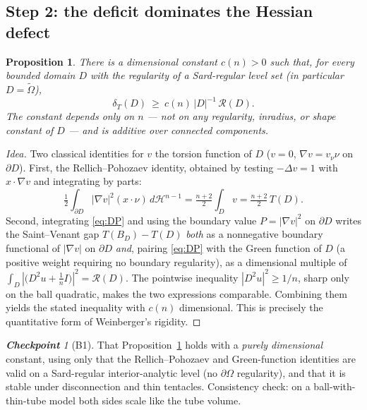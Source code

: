 \documentclass[11pt]{amsart}
\newtheorem{proposition}[theorem]{Proposition}
\theoremstyle{definition}
\theoremstyle{remark}
\newtheorem*{checkpoint}{\textbf{Checkpoint}}
\newcommand{\Om}{\Omega}
\newcommand{\Ot}{\widetilde\Omega}
\newcommand{\dT}{\delta_T}
\newcommand{\Hess}{D^2u}
\newcommand{\TF}{\bigl(\Hess+\tfrac1n I\bigr)}
\newcommand{\R}{\mathcal R}
\newcommand{\Hn}{\mathcal H^{n-1}}
\begin{document}
\subsection{Step 2: the deficit dominates the Hessian defect}
\begin{proposition}\label{prop:B1}
There is a dimensional constant $c(n)>0$ such that, for every bounded domain
$D$ with the regularity of a Sard-regular level set \textup{(}in particular
$D=\Ot$\textup{)},
\[
  \dT(D)\ \ge\ c(n)\,|D|^{-1}\,\R(D).
\]
The constant depends only on $n$ --- not on any regularity, inradius, or shape
constant of $D$ --- and is additive over connected components.
\end{proposition}
\begin{proof}[Idea]
Two classical identities for $v$ the torsion function of $D$
($v=0$, $\nabla v=v_\nu\nu$ on $\partial D$). First, the Rellich--Pohozaev
identity, obtained by testing $-\Delta v=1$ with $x\!\cdot\!\nabla v$ and
integrating by parts:
\[
  \tfrac12\!\int_{\partial D}|\nabla v|^2(x\!\cdot\!\nu)\,d\Hn
  =\tfrac{n+2}{2}\!\int_D v=\tfrac{n+2}{2}\,T(D).
\]
Second, integrating \eqref{eq:DP} and using the boundary value
$P=|\nabla v|^2$ on $\partial D$ writes the Saint--Venant gap
$T(B_D)-T(D)$ \emph{both} as a nonnegative boundary functional of
$|\nabla v|$ on $\partial D$ \emph{and}, pairing \eqref{eq:DP} with the Green
function of $D$ (a positive weight requiring no boundary regularity), as a
dimensional multiple of $\int_D|\TF|^2=\R(D)$. The pointwise inequality
$|\Hess|^2\ge1/n$, sharp only on the ball quadratic, makes the two
expressions comparable. Combining them yields the stated inequality with
$c(n)$ dimensional. This is precisely the quantitative form of Weinberger's
rigidity.
\end{proof}
\begin{checkpoint}[B1]
That Proposition~\ref{prop:B1} holds with a \emph{purely dimensional} constant,
using only that the Rellich--Pohozaev and Green-function identities are valid
on a Sard-regular interior-analytic level (no $\partial\Om$ regularity), and
that it is stable under disconnection and thin tentacles. Consistency check:
on a ball-with-thin-tube model both sides scale like the tube volume.
\end{checkpoint}
\end{document}

